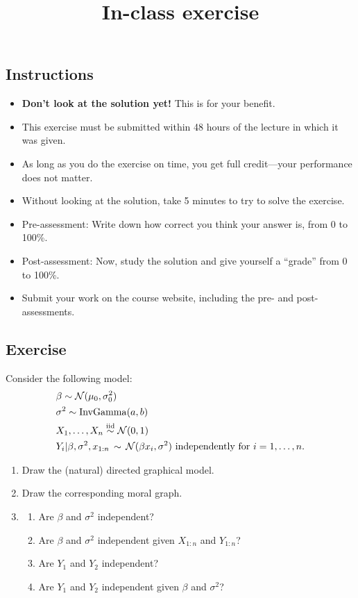 \documentclass[12pt]{article}
\title{In-class exercise}
\author{}
\date{}
\begin{document}
\maketitle

\subsection*{Instructions}
\begin{itemize}
\item \textbf{Don't look at the solution yet!} This is for your benefit.
\item This exercise must be submitted within 48 hours of the lecture in which it was given. 
\item As long as you do the exercise on time, you get full credit---your performance does not matter.
\item Without looking at the solution, take 5 minutes to try to solve the exercise.
\item Pre-assessment: Write down how correct you think your answer is, from 0 to 100\%.
\item Post-assessment: Now, study the solution and give yourself a ``grade'' from 0 to 100\%.
\item Submit your work on the course website, including the pre- and post- assessments.
\end{itemize}

\subsection*{Exercise}
Consider the following model:
\begin{align*}
    & \beta \sim \mathcal{N}(\mu_0,\sigma_0^2) \\
    & \sigma^2 \sim \operatorname*{InvGamma}(a,b) \\
    & X_1,\ldots,X_n\stackrel{\mathrm{iid}}{\sim} \mathcal{N}(0,1) \\
    & Y_i|\beta,\sigma^2,x_{1:n}\,\sim\,\mathcal{N}(\beta x_i,\sigma^2) \text{ independently for } i=1,\ldots,n.
\end{align*}
\begin{enumerate}
    \item Draw the (natural) directed graphical model.
    \item Draw the corresponding moral graph.
    \item 
    \begin{enumerate}
        \item Are $\beta$ and $\sigma^2$ independent?
        \item Are $\beta$ and $\sigma^2$ independent given $X_{1:n}$ and $Y_{1:n}$?
        \item Are $Y_1$ and $Y_2$ independent?
        \item Are $Y_1$ and $Y_2$ independent given $\beta$ and $\sigma^2$?
    \end{enumerate}
\end{enumerate}
\end{document}
